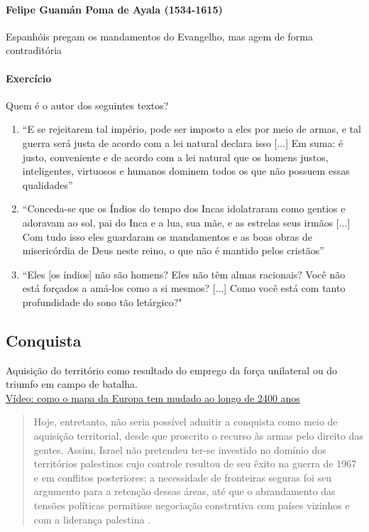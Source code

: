 \documentclass{article}
\begin{document}
\paragraph{Felipe Guamán Poma de Ayala (1534-1615)}Espanhóis pregam os mandamentos do Evangelho, mas agem de forma contraditória

\paragraph{Exercício}
Quem é o autor dos seguintes textos?
\begin{enumerate}
    \item ``E se rejeitarem tal império, pode ser imposto a eles por meio de armas, e tal guerra será justa de acordo com a lei natural declara isso [...] Em suma: é justo, conveniente e de acordo com a lei natural que os homens justos, inteligentes, virtuosos e humanos dominem todos os que não possuem essas qualidades”
    \item ``Conceda-se que os Índios do tempo dos Incas idolatraram como gentios e adoravam ao sol, pai do Inca e a lua, sua mãe, e as estrelas seus irmãos [...] Com tudo isso eles guardaram os mandamentos e as boas obras de misericórdia de Deus neste reino, o que não é mantido pelos cristãos”
    \item ``Eles [os índios] não são homens? Eles não têm almas racionais? Você não está
forçados a amá-los como a si mesmos? [...] Como você está com tanto
profundidade do sono tão letárgico?"
\end{enumerate}

\subsection{Conquista}

Aquisição do território como resultado do emprego da força unilateral ou do triumfo em campo de batalha.\\

\href{https://youtu.be/UY9P0QSxlnI}{Vídeo: como o mapa da Europa tem mudado ao longo de 2400 anos}

\begin{quote}
    Hoje, entretanto, não seria possível admitir a conquista como meio de aquisição territorial, desde que proscrito o recurso às armas pelo direito das gentes. Assim, Israel não pretendeu ter-se investido no domínio dos territórios palestinos cujo controle resultou de seu êxito na guerra de 1967 e em conflitos posteriores: a necessidade de fronteiras seguras foi seu argumento para a retenção dessas áreas, até que o abrandamento das tensões políticas permitisse negociação construtiva com países vizinhos e com a liderança palestina \cite[p.~73; cf. figuras \ref{fig:guerra_6_dias} e \ref{fig:territorios_palestinos_ocupados}]{rezek_direito_2024}.
\end{quote}
\end{document}
